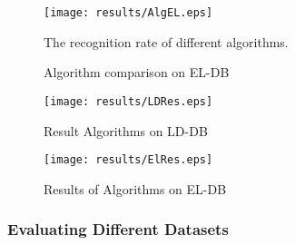\begin{figure}
	\centering		
	 \texttt{[image: results/AlgEL.eps]}
	 	\caption{Algorithm comparison on EL-DB} The recognition rate of different algorithms. 
	 	\label{fig:testEL}
\end{figure} 

 
 
 
 
\begin{figure}
	\centering
		\texttt{[image: results/LDRes.eps]}
	\caption{Result Algorithms on LD-DB}
	\label{fig:LDRes}
\end{figure}
\begin{figure}
	\centering
		\texttt{[image: results/ElRes.eps]}
	\caption{Results of Algorithms on EL-DB}
	\label{fig:ElRes}
\end{figure}


 

\subsubsection {Evaluating Different Datasets}
 \label{sec:EffectsofSymbolComplixity}
 
